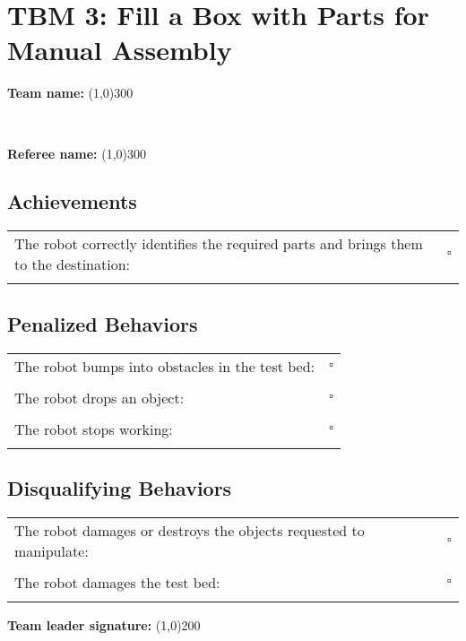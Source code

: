 \section*{TBM 3: Fill a Box with Parts for Manual Assembly}
\vspace{0.5cm} \begin{large} \textbf{Team name:} \line(1,0){300} \end{large} \vspace{0.7cm} \\ 
\vspace{0.5cm} \begin{large} \textbf{Referee name:} \line(1,0){300} \end{large} \vspace{0.2cm}

\subsection*{Achievements}
\begin{tabular}{ l c}
The robot correctly identifies the required parts and brings them to the destination: & $\square$ \\ \\




\end{tabular}

\subsection*{Penalized Behaviors}
\begin{tabular}{ l c}
The robot bumps into obstacles in the test bed: & $\square$ \\ \\
The robot drops an object: & $\square$ \\ \\
The robot stops working: & $\square$ \\ \\


\end{tabular}

\subsection*{Disqualifying Behaviors}
\begin{tabular}{ l c}
The robot damages or destroys the objects requested to manipulate: & $\square$ \\ \\
The robot damages the test bed: & $\square$ \\ \\

\end{tabular}

\vspace{1.5cm}
\begin{large}
\textbf{Team leader signature:}
\line(1,0){200}
\end{large}